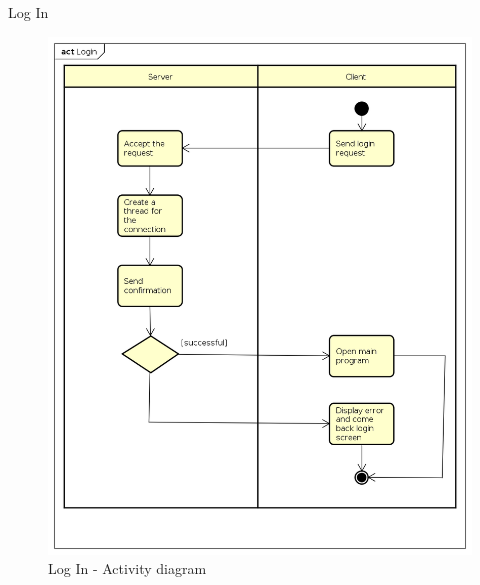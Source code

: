 \documentclass{beamer}
\begin{document}
\begin{frame}{Log In}
\begin{figure}
	\begin{center}
		\includegraphics[scale=0.2]{Login.png}
		\caption{Log In - Activity diagram}
	\end{center}
\end{figure}
\end{frame}
\end{document}
